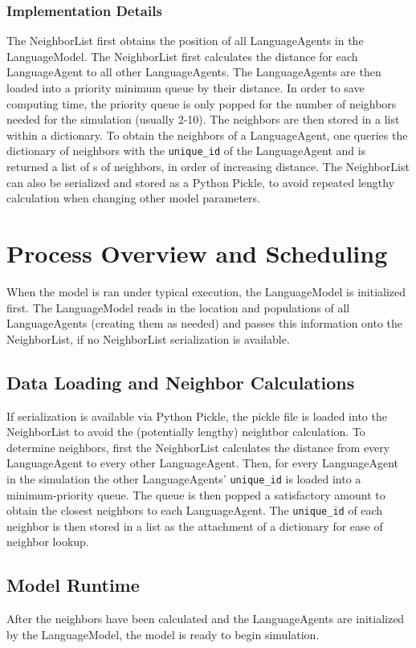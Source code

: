 \documentclass{article}
\begin{document}
\subsubsection{Implementation Details}
The NeighborList first obtains the position of all LanguageAgents in the LanguageModel. The NeighborList first calculates the distance for each LanguageAgent to all other LanguageAgents. The LanguageAgents are then loaded into a priority minimum queue by their distance. In order to save computing time, the priority queue is only popped for the number of neighbors needed for the simulation (usually 2-10). The neighbors are then stored in a list within a dictionary. To obtain the neighbors of a LanguageAgent, one queries the dictionary of neighbors with the \texttt{unique\_id} of the LanguageAgent and is returned a list of s of neighbors, in order of increasing distance.
The NeighborList can also be serialized and stored as a Python Pickle, to avoid repeated lengthy calculation when changing other model parameters.


\section{Process Overview and Scheduling}
When the model is ran under typical execution, the LanguageModel is initialized first. The LanguageModel reads in the location and populations of all LanguageAgents (creating them as needed) and passes this information onto the NeighborList, if no NeighborList serialization is available.

\subsection{Data Loading and Neighbor Calculations}
If serialization is available via Python Pickle, the pickle file is loaded into the NeighborList to avoid the (potentially lengthy) neightbor calculation. To determine neighbors, first the NeighborList calculates the distance from every LanguageAgent to every other LanguageAgent. Then, for every LanguageAgent in the simulation the other LanguageAgents' \texttt{unique\_id} is loaded into a minimum-priority queue. The queue is then popped a satisfactory amount to obtain the closest neighbors to each LanguageAgent. The \texttt{unique\_id} of each neighbor is then stored in a list as the attachment of a dictionary for ease of neighbor lookup.

\subsection{Model Runtime}
After the neighbors have been calculated and the LanguageAgents are initialized by the LanguageModel, the model is ready to begin simulation.
\end{document}

